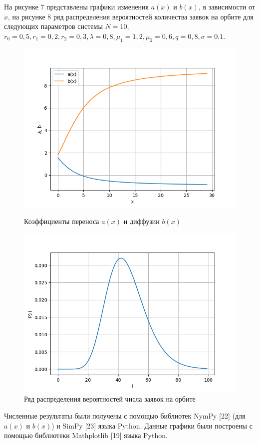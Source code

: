 На рисунке 7 представлены графики изменения $a(x)$ и $b(x)$, в зависимости от $x$, на рисунке 8 ряд распределения вероятностей количества заявок на орбите для следующих параметров системы $N=10$, $r_{0}=0,5, r_{1}=0,2, r_{2}=0,3, \lambda=0,8, \mu_{1}=1,2, \mu_{2}=0,6 , q=0,8, \sigma=0.1.$
\begin{figure}[H]
	\centering
	\begin{minipage}[h]{0.49\linewidth}
		\includegraphics[width=0.8\linewidth]{ab10} 	
		\caption{Коэффициенты переноса $a(x)$ и диффузии $b(x)$}
		\label{ris:experimoriginal}
	\end{minipage}
	\hfill
	\begin{minipage}[h]{0.49\linewidth}
		\includegraphics[width=0.8\linewidth]{P10} 
		\caption{Ряд распределения вероятностей числа заявок на орбите}
		\label{ris:experimcoded}
	\end{minipage}
\end{figure}

Численные результаты были получены с помощью библиотек NymPy [22] (для $a(x)$ и $b(x)$) и SimPy [23] языка Python.
Данные графики были построены с помощью библиотеки Mathplotlib [19] языка Python.

